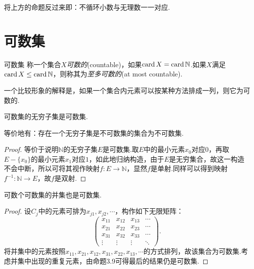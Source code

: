 将上方的命题反过来即：不循环小数与无理数一一对应.

\section{可数集}

\begin{definition}{可数集}
	称一个集合$X$\textit{可数的}(countable)，如果$\operatorname{card} X = \operatorname{card} \mathbb{N}$.如果$X$满足$\operatorname{card} X \leq \operatorname{card} \mathbb{N}$，则称其为\textit{至多可数的}(at most countable).
\end{definition}

一个比较形象的解释是，如果一个集合内元素可以按某种方法排成一列，则它为可数的.

\begin{proposition}
	可数集的无穷子集是可数集.
\end{proposition}
\begin{remark}
	等价地有：存在一个无穷子集是不可数集的集合为不可数集.
\end{remark}
\begin{proof}
	等价于说明$\mathbb{N}$的无穷子集$E$是可数集.取$E$中的最小元素$x_0$对应$0$，再取$E-\{ x_0 \}$的最小元素$x_1$对应$1$，如此地归纳构造，由于$E$是无穷集合，故这一构造不会中断，所以可将其视作映射$f:E \to \mathbb{N}$，显然$f$是单射.同样可以得到映射$f^{-1}:\mathbb{N} \to E$，故$f$是双射.
\end{proof}

\begin{proposition}
	可数个可数集的并集也是可数集.
\end{proposition}
\begin{proof}
	设$C_j$中的元素可排为$x_{j1},x_{j2},\cdots $，构作如下无限矩阵：$$\begin{pmatrix}
 x_{11} & x_{12} & x_{13} & \cdots \\
 x_{21} & x_{22} & x_{23} & \cdots \\
 x_{31} & x_{32} & x_{33} & \cdots \\
 \vdots & \vdots & \vdots & \ddots
\end{pmatrix}.$$
	将并集中的元素按照$x_{11},x_{21},x_{12},x_{31},x_{22},x_{13},\cdots$的方式排列，故该集合为可数集.考虑并集中出现的重复元素，由命题3.9可得最后的结果仍是可数集.
\end{proof}

